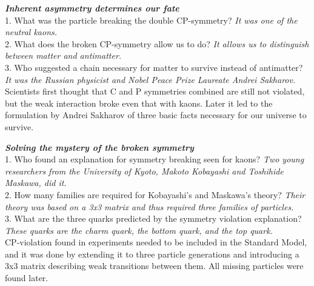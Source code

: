 \documentclass[a4paper, 12pt]{article}
\def\ans#1{\textit{#1}}
\begin{document}
\textbf{\textit{Inherent asymmetry determines our fate}}
\\1. What was the particle breaking the double CP-symmetry? \ans{It was one of the neutral kaons.}
\\2. What does the broken CP-symmetry allow us to do? \ans{It allows us to distinguish between matter and antimatter.}
\\3. Who suggested a chain necessary for matter to survive instead of antimatter? \ans{It was the Russian physicist and Nobel Peace Prize Laureate Andrei Sakharov.}
\\ Scientists first thought that C and P symmetries combined are still not violated, but the weak interaction broke even that with kaons. Later it led to the formulation by Andrei Sakharov of three basic facts necessary for our universe to survive.

\textbf{\textit{Solving the mystery of the broken symmetry}}
\\1. Who found an explanation for symmetry breaking seen for kaons? \ans{Two young researchers from the University of Kyoto, Makoto Kobayashi and Toshihide Maskawa, did it.}
\\2. How many families are required for Kobayashi's and Maskawa's theory? \ans{Their theory was based on a 3x3 matrix and thus required three families of particles.}
\\3. What are the three quarks predicted by the symmetry violation explanation? \ans{These quarks are the charm quark, the bottom quark, and the top quark.}
\\ CP-violation found in experiments needed to be included in the Standard Model, and it was done by extending it to three particle generations and introducing a 3x3 matrix describing weak transitions between them. All missing particles were found later.

\end{document}
